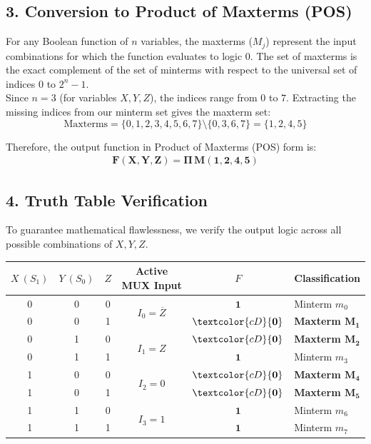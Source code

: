 \documentclass[12pt,a3paper]{article}
\begin{document}
\begin{enumerate}
\begin{tcolorbox}[enhanced,breakable,ansbox,colback=cD!4,colframe=cD,boxrule=0.8pt,arc=5pt,title={\textbf{Answer}},fonttitle=\bfseries\color{white},colbacktitle=cD]
\vspace{0.2cm}
\subsection*{3. Conversion to Product of Maxterms (POS)}
For any Boolean function of $n$ variables, the maxterms ($M_j$) represent the input combinations for which the function evaluates to logic $0$. The set of maxterms is the exact complement of the set of minterms with respect to the universal set of indices $0$ to $2^n - 1$.
\\
Since $n = 3$ (for variables $X, Y, Z$), the indices range from $0$ to $7$. Extracting the missing indices from our minterm set gives the maxterm set:
\[ \text{Maxterms} = \{0, 1, 2, 3, 4, 5, 6, 7\} \setminus \{0, 3, 6, 7\} = \{1, 2, 4, 5\} \]

Therefore, the output function in Product of Maxterms (POS) form is:
\begin{align*}
    \mathbf{F(X, Y, Z) = \Pi\,M(1, 2, 4, 5)}
\end{align*}

\vspace{0.2cm}
\subsection*{4. Truth Table Verification}
To guarantee mathematical flawlessness, we verify the output logic across all possible combinations of $X, Y, Z$.

\begin{center}
\renewcommand{\arraystretch}{1.2}
\begin{tabular}{ccc | c | c | l}
\toprule
\textbf{$X \ (S_1)$} & \textbf{$Y \ (S_0)$} & \textbf{$Z$} & \textbf{Active MUX Input} & \textbf{$F$} & \textbf{Classification} \\
\midrule
0 & 0 & 0 & \multirow{2}{*}{$I_0 = \overline{Z}$} & $\mathbf{1}$ & Minterm $m_0$ \\
0 & 0 & 1 & & $\textcolor{cD}{\mathbf{0}}$ & \textcolor{cD}{\textbf{Maxterm $\mathbf{M_1}$}} \\
\midrule
0 & 1 & 0 & \multirow{2}{*}{$I_1 = Z$} & $\textcolor{cD}{\mathbf{0}}$ & \textcolor{cD}{\textbf{Maxterm $\mathbf{M_2}$}} \\
0 & 1 & 1 & & $\mathbf{1}$ & Minterm $m_3$ \\
\midrule
1 & 0 & 0 & \multirow{2}{*}{$I_2 = 0$} & $\textcolor{cD}{\mathbf{0}}$ & \textcolor{cD}{\textbf{Maxterm $\mathbf{M_4}$}} \\
1 & 0 & 1 & & $\textcolor{cD}{\mathbf{0}}$ & \textcolor{cD}{\textbf{Maxterm $\mathbf{M_5}$}} \\
\midrule
1 & 1 & 0 & \multirow{2}{*}{$I_3 = 1$} & $\mathbf{1}$ & Minterm $m_6$ \\
1 & 1 & 1 & & $\mathbf{1}$ & Minterm $m_7$ \\
\bottomrule
\end{tabular}
\end{center}


\end{tcolorbox}
\end{enumerate}
\end{document}
